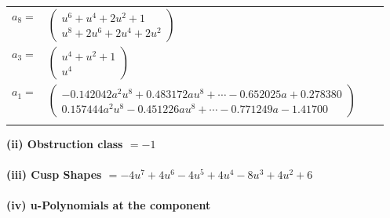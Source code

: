 \documentclass[1p]{elsarticle_modified}
\theoremstyle{definition}
\begin{document}
\begin{tabular}{m{7pt} m{180pt} m{7pt} m{180pt} }
\flushright $a_{8}=$&$\begin{pmatrix}u^6+u^4+2 u^2+1\\u^8+2 u^6+2 u^4+2 u^2\end{pmatrix}$ \\
\flushright $a_{3}=$&$\begin{pmatrix}u^4+u^2+1\\u^4\end{pmatrix}$ \\
\flushright $a_{1}=$&$\begin{pmatrix}-0.142042 a^{2} u^{8}+0.483172 a u^{8}+\cdots-0.652025 a+0.278380\\0.157444 a^{2} u^{8}-0.451226 a u^{8}+\cdots-0.771249 a-1.41700\end{pmatrix}$\\&\end{tabular}
\flushleft \textbf{(ii) Obstruction class $= -1$}\\~\\
\flushleft \textbf{(iii) Cusp Shapes $= -4 u^7+4 u^6-4 u^5+4 u^4-8 u^3+4 u^2+6$}\\~\\
\newpage\renewcommand{\arraystretch}{1}
\flushleft \textbf{(iv) u-Polynomials at the component}\newline \\
\end{document}
